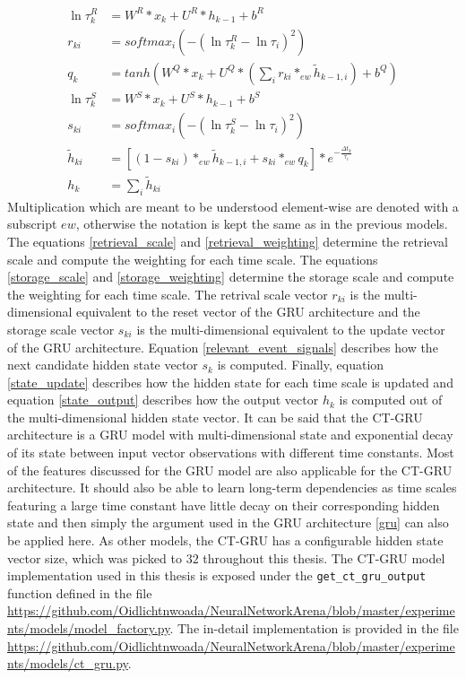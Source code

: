 \documentclass[draft,final]{vutinfth} %
\begin{document}
    \begin{align}
    \label{retrieval_scale}
    \ln{\tau_k^R} &= W^R*x_k + U^R*h_{k-1} + b^R \\
    \label{retrieval_weighting}
    r_{ki} &= softmax_i(-(\ln{\tau_k^R-\ln{\tau_i}})^2) \\
    \label{relevant_event_signals}
    q_k &= tanh(W^Q*x_k + U^Q*(\sum_i {r_{ki} *_{ew} \tilde{h}_{k-1,i}}) + b^Q) \\
    \label{storage_scale}
    \ln{\tau_k^S} &= W^S*x_k + U^S*h_{k-1} + b^S \\
    \label{storage_weighting}
    s_{ki} &= softmax_i(-(\ln{\tau_k^S-\ln{\tau_i}})^2) \\
    \label{state_update}
    \tilde{h}_{ki} &= [(1 - s_{ki}) *_{ew} \tilde{h}_{k-1,i} + s_{ki} *_{ew} q_k] * e^{-\frac{\Delta t_k}{\tau_i}} \\
    \label{state_output}
    h_k &= \sum_i{\tilde{h}_{ki}}
    \end{align}
    Multiplication which are meant to be understood element-wise are denoted with a subscript $ew$, otherwise the notation is kept the same as in the previous models.
    The equations \ref{retrieval_scale} and \ref{retrieval_weighting} determine the retrieval scale and compute the weighting for each time scale.
    The equations \ref{storage_scale} and \ref{storage_weighting} determine the storage scale and compute the weighting for each time scale.
    The retrival scale vector $r_{ki}$ is the multi-dimensional equivalent to the reset vector of the GRU architecture and the storage scale vector $s_{ki}$ is the multi-dimensional equivalent to the update vector of the GRU architecture.
    Equation \ref{relevant_event_signals} describes how the next candidate hidden state vector $s_k$ is computed.
    Finally, equation \ref{state_update} describes how the hidden state for each time scale is updated and equation \ref{state_output} describes how the output vector $h_k$ is computed out of the multi-dimensional hidden state vector.
    It can be said that the CT-GRU architecture is a GRU model with multi-dimensional state and exponential decay of its state between input vector observations with different time constants.
    Most of the features discussed for the GRU model are also applicable for the CT-GRU architecture.
    It should also be able to learn long-term dependencies as time scales featuring a large time constant have little decay on their corresponding hidden state and then simply the argument used in the GRU architecture \ref{gru} can also be applied here.
    As other models, the CT-GRU has a configurable hidden state vector size, which was picked to $32$ throughout this thesis.
    The CT-GRU model implementation used in this thesis is exposed under the \texttt{get\_ct\_gru\_output} function defined in the file \url{https://github.com/Oidlichtnwoada/NeuralNetworkArena/blob/master/experiments/models/model_factory.py}.
    The in-detail implementation is provided in the file \url{https://github.com/Oidlichtnwoada/NeuralNetworkArena/blob/master/experiments/models/ct_gru.py}.
\end{document}
